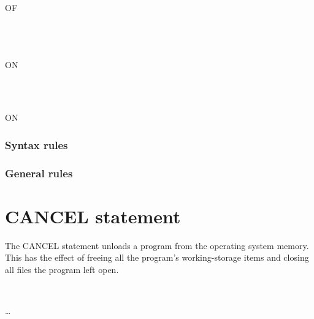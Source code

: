 \begin{syntax}
  \begin{0-1}
    \begin{1=}
       \\
    \end{1=}
    \begin{1=}
       \identifier \\
       OF \identifier \\
       \\
       \\ %
       \\ %
    \end{1=}
  \end{0-1}

  \begin{0+}
    ON
    \begin{1=}
       \\
    \end{1=}
    \imperativestatement \\
     ON  \imperativestatement
  \end{0+}

  \begin{0-1}
  \end{0-1}
\end{syntax}

\subsubsection{Syntax rules}

\subsubsection{General rules}

\section{CANCEL statement}

The CANCEL statement unloads a program from the operating system memory. This has the effect of freeing all the program's working-storage items and closing all files the program left open.

\begin{syntax}
  \begin{1=}
    \identifier \\
    \literal
  \end{1=} \ldots
\end{syntax}

